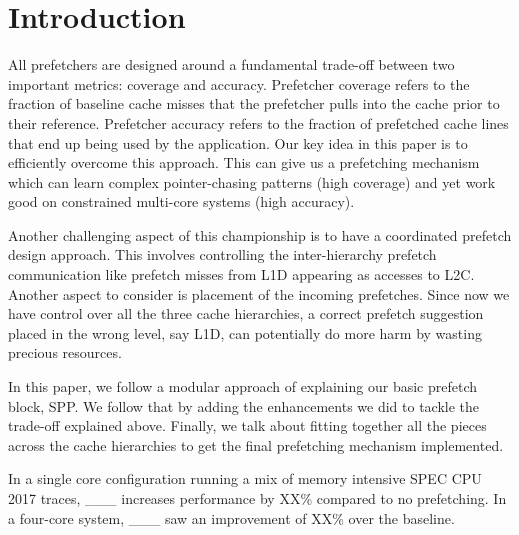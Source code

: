 \section{Introduction}
\label{Introduction}

All prefetchers are designed around a fundamental trade-off between
two important metrics: coverage and accuracy. Prefetcher coverage
refers to the fraction of baseline cache misses that the prefetcher
pulls into the cache prior to their reference. Prefetcher
accuracy refers to the fraction of prefetched cache lines that end up
being used by the application. Our key idea in this paper is to 
efficiently overcome this approach. This can give us a prefetching 
mechanism which can learn complex pointer-chasing patterns (high coverage)
and yet work good on constrained multi-core systems (high accuracy).

Another challenging aspect of this championship is to have a coordinated 
prefetch design approach. This involves controlling the inter-hierarchy 
prefetch communication like prefetch misses from L1D appearing as accesses 
to L2C. Another aspect to consider is placement of the incoming prefetches.
Since now we have control over all the three cache hierarchies, a correct 
prefetch suggestion placed in the wrong level, say L1D, can potentially 
do more harm by wasting precious resources.

In this paper, we follow a modular approach of explaining our basic prefetch
block, SPP. We follow that by adding the enhancements we did to tackle the 
trade-off explained above. Finally, we talk about fitting together all the 
pieces across the cache hierarchies to get the final prefetching mechanism 
implemented.

In a single core configuration running a mix of memory intensive SPEC CPU 
2017 traces, \_\_\_ increases performance by XX\% compared to no prefetching. 
In a four-core system, \_\_\_ saw an improvement of XX\% over the baseline.
